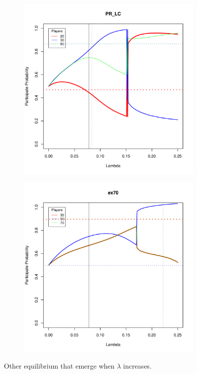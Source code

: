 \begin{figure}[h]
	\begin{subfigure}{0.5\textwidth}
		\includegraphics[width=0.7\linewidth]{../../results/figures/PR_LC_eqilibria}
		\caption{}
		\label{fig:prlceqilibria}
	\end{subfigure}
	\hfill
	\begin{subfigure}{0.5\textwidth}
		\includegraphics[width=0.7\linewidth]{../../results/figures/ex70_eqilibria}
		\caption{}
		\label{fig:ex70eqilibria}
	\end{subfigure}

\label{fig:otherQRE}
\caption{Other equilibrium that emerge when  $\lambda$ increases.}
\end{figure}
